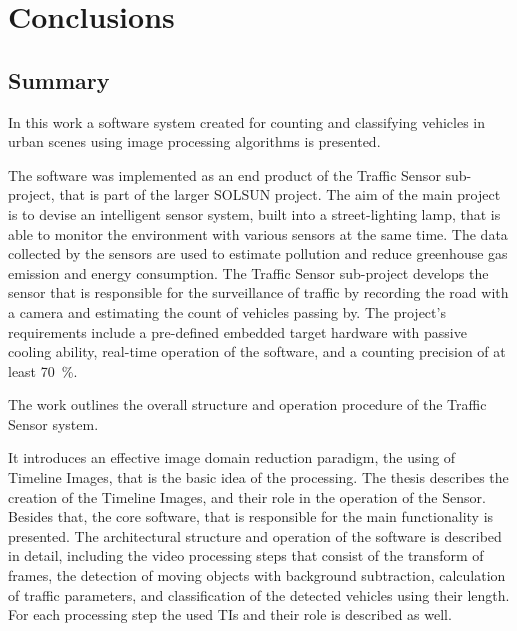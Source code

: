 \renewcommand{\thechapter}{\Alph{chapter}}
\setcounter{chapter}{3}  %
\chapter*{Conclusions}\label{chap:Conclusions}
\setcounter{equation}{0} 
\setcounter{section}{0}
\section{Summary}
In this work a software system created for counting and classifying vehicles in urban scenes using image processing algorithms is presented.

The software was implemented as an end product of the Traffic Sensor sub-project, that is part of the larger SOLSUN project.
The aim of the main project is to devise an intelligent sensor system, built into a street-lighting lamp, that is able to monitor the environment with various sensors at the same time.
The data collected by the sensors are used to estimate pollution and reduce greenhouse gas emission and energy consumption. 
The Traffic Sensor sub-project develops the sensor that is responsible for the surveillance of traffic by recording the road with a camera and estimating the count of vehicles passing by.
The project's requirements include a pre-defined embedded target hardware with passive cooling ability, real-time operation of the software, and a counting precision of at least \SI{70}{\%}.

The work outlines the overall structure and operation procedure of the Traffic Sensor system. 

It introduces an effective image domain reduction paradigm, the using of Timeline Images, that is the basic idea of the processing.
The thesis describes the creation of the Timeline Images, and their role in the operation of the Sensor.
Besides that, the core software, that is responsible for the main functionality is presented.
The architectural structure and operation of the software is described in detail, including the video processing steps that consist of the transform of frames, the detection of moving objects with background subtraction, calculation of traffic parameters, and classification of the detected vehicles using their length.
For each processing step the used TIs and their role is described as well.

